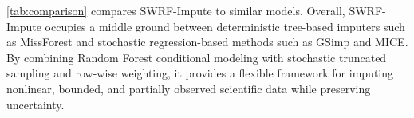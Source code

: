 \documentclass[preprint]{aastex631}
\begin{document}
\autoref{tab:comparison} compares SWRF-Impute to similar models. Overall, SWRF-Impute occupies a middle ground between deterministic tree-based imputers such as MissForest and stochastic regression-based methods such as GSimp and MICE. By combining Random Forest conditional modeling with stochastic truncated sampling and row-wise weighting, it provides a flexible framework for imputing nonlinear, bounded, and partially observed scientific data while preserving uncertainty.



\end{document}
